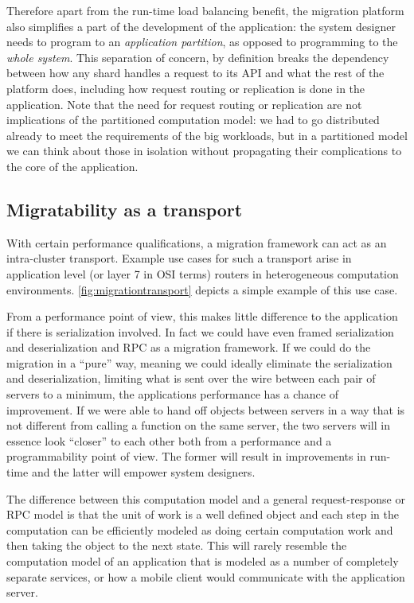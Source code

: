 Therefore apart from the run-time load balancing benefit, the
    migration platform also simplifies a part of the development of the
    application: the system designer needs to program to an
    \emph{application partition}, as opposed to programming to the
    \emph{whole system}. This separation of concern,
    by definition breaks the dependency between how
    any shard handles a request to its API and what the rest of the
    platform does, including how request routing or replication is done
    in the application. Note that the need for request routing or
    replication are not implications of the partitioned computation
    model: we had to go distributed already to meet the requirements of
    the big workloads, but in a partitioned model we can think about those
    in isolation without propagating their complications to the
    core of the application.


\subsection{Migratability as a transport}
With certain performance qualifications, a migration framework can act as
an intra-cluster transport. Example use cases for such a transport arise
in application level (or layer 7 in OSI terms) routers in heterogeneous
computation environments. \autoref{fig:migrationtransport} depicts
a simple example of this use case. 


From a performance point of view, this makes little difference to the
application if there is serialization involved. In fact we could have
even framed
serialization and deserialization and RPC as a migration framework. If we
could do the migration in a ``pure'' way, meaning we could ideally
eliminate the serialization and deserialization, limiting what is sent
over the wire between each pair of servers to a minimum, the applications
performance has a chance of improvement. If we were able to hand off
objects between servers in a way that is not different from calling a
function on the same server, the two servers will in essence look
``closer'' to each other both from a performance and a programmability
point of view. The former will result in improvements in run-time and
the latter will empower system designers.

The difference between this computation model and a general
request-response or RPC model is that the unit of work is a
well defined object and each step in the computation can be
efficiently modeled as doing certain computation work and then taking
the object to the next state. This will rarely resemble the computation
model of an application that is modeled as a number of completely separate
services, or how a mobile client would communicate with the application
server.

